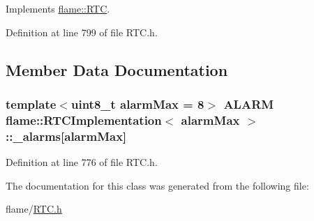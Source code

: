 Implements \hyperlink{classflame_1_1_r_t_c_a88d193491a668daf956bcc672f3dfc06}{flame\-::\-R\-T\-C}.



Definition at line 799 of file R\-T\-C.\-h.



\subsection{Member Data Documentation}
\hypertarget{classflame_1_1_r_t_c_implementation_a78359b4130cbf9bbd314b31b6826a8be}{
\subsubsection[{\-\_\-alarms}]{\setlength{\rightskip}{0pt plus 5cm}template$<$uint8\-\_\-t alarm\-Max = 8$>$ {\bf A\-L\-A\-R\-M} {\bf flame\-::\-R\-T\-C\-Implementation}$<$ alarm\-Max $>$\-::\-\_\-alarms\mbox{[}alarm\-Max\mbox{]}\hspace{0.3cm}{\ttfamily [protected]}}}\label{classflame_1_1_r_t_c_implementation_a78359b4130cbf9bbd314b31b6826a8be}


Definition at line 776 of file R\-T\-C.\-h.



The documentation for this class was generated from the following file\-:\begin{DoxyCompactItemize}
\item 
flame/\hyperlink{_r_t_c_8h}{R\-T\-C.\-h}\end{DoxyCompactItemize}
